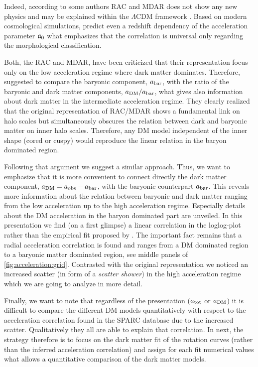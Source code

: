 Indeed, according to some authors RAC and MDAR does not show any new physics and may be explained within the $\Lambda$CDM framework \citep{2016arXiv161206329N,2016arXiv161006183K,2016arXiv161208857S}. Based on modern cosmological simulations, \citet{2016arXiv161006183K} predict even a redshift dependency of the acceleration parameter $\mathfrak{a}_0$ what emphasizes that the correlation is universal only regarding the morphological classification.

Both, the RAC and MDAR, have been criticized that their representation focus only on the low acceleration regime where dark matter dominates. Therefore, \citet{2017arXiv170708280C} suggested to compare the baryonic component, $a_\mathrm{bar}$, with the ratio of the baryonic and dark matter components, $a_\mathrm{DM}/a_\mathrm{bar}$, what gives also information about dark matter in the intermediate acceleration regime. They clearly realized that the original representation of RAC/MDAR shows a fundamental link on halo scales but simultaneously obscures the relation between dark and baryonic matter on inner halo scales. Therefore, any DM model independent of the inner shape (cored or cuspy) would reproduce the linear relation in the baryon dominated region.

Following that argument we suggest a similar approach. Thus, we want to emphasize that it is more convenient to connect directly the dark matter component, $a_\mathrm{DM} = a_\mathrm{obs} - a_\mathrm{bar}$, with the baryonic counterpart $a_\mathrm{bar}$. This reveals more information about the relation between baryonic and dark matter ranging from the low acceleration up to the high acceleration regime. Especially details about the DM acceleration in the baryon dominated part are unveiled. In this presentation we find (on a first glimpse) a linear correlation in the loglog-plot rather than the empirical fit proposed by \citet{2016arXiv160905917M}. The important fact remains that a radial acceleration correlation is found and ranges from a DM dominated region to a baryonic matter dominated region, see middle panels of \cref{fig:acceleration:grid}. Contrasted with the original representation we noticed an increased scatter (in form of a \textit{scatter shower}) in the high acceleration regime which we are going to analyze in more detail.

Finally, we want to note that regardless of the presentation ($a_\mathrm{tot}$ or $a_\mathrm{DM}$) it is difficult to compare the different DM models quantitatively with respect to the acceleration correlation found in the SPARC database due to the increased scatter. Qualitatively they all are able to explain that correlation. In next, the strategy therefore is to focus on the dark matter fit of the rotation curves (rather than the inferred acceleration correlation) and assign for each fit numerical values what allows a quantitative comparison of the dark matter models.